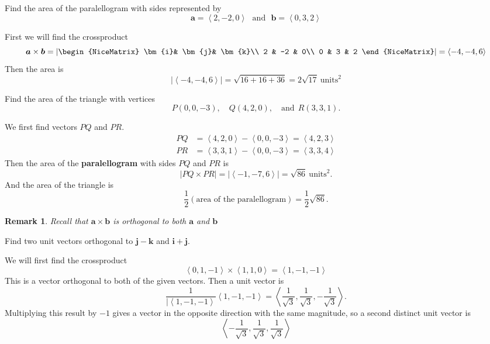 \documentclass[12pt]{exam}
\newcommand{\ba}{\bm{a}}
\newcommand{\bb}{\bm{b}}
\newcommand{\bi}{\bm{i}}
\newcommand{\bj}{\bm{j}}
\newcommand{\bk}{\bm{k}}
\newcommand{\gen}[1]{\left\langle #1 \right\rangle}
\newtheorem*{remark}{Remark}
\begin{document}
\begin{questions}
\question Find the area of the paralellogram with sides represented by
    \[
        \ba=\gen{2,-2,0} ~~~\text{and}~~~ \bb=\gen{0,3,2}
    \]
    \ifprintanswers
        \begin{solution}
            First we will find the crossproduct
            \[
                \ba\times\bb = 
                    \left|\begin{NiceMatrix}
                        \bi & \bj & \bk\\
                        2 & -2 & 0\\
                        0 & 3 & 2
                        \end{NiceMatrix}\right| = \gen{-4,-4,6}
            \]
            Then the area is 
            \[
                |\gen{-4,-4,6}|=\sqrt{16+16+36}=2\sqrt{17}~\text{units}^2
            \]
        \end{solution}
    \else
        \vfill
    \fi    



\question Find the area of the triangle with vertices 
\[
    P(0,0,-3),\quad Q(4,2,0),\quad \text{and}~~R(3,3,1).
\]

\ifprintanswers
        \begin{solution}
            We first find vectors \(PQ\) and \(PR\).
            \begin{align*}
                PQ & = \gen{4,2,0}-\gen{0,0,-3}=\gen{4,2,3}\\
                PR & = \gen{3,3,1}-\gen{0,0,-3}=\gen{3,3,4}
            \end{align*}
        Then the area of the \textbf{paralellogram} with sides \(PQ\) and \(PR\) is
        \[
            |PQ\times PR| = |\gen{-1,-7,6}| = \sqrt{86}~\text{units}^2.
        \]
        And the area of the triangle is 
        \[
            \frac{1}{2}(\text{area of the paralellogram})=\frac{1}{2}\sqrt{86}.
        \]
        
        \end{solution}
    \else
        \vfill
    \fi    

\newpage

\begin{remark}
    Recall that \(\ba\times\bb\) is orthogonal to both \(\ba\) and \(\bb\)
\end{remark}

\question Find two unit vectors orthogonal to \(\bm{j}-\bm{k}\) and \(\bm{i}+\bm{j}\).
\ifprintanswers
        \begin{solution}
            We will first find the crossproduct
            \[
            \gen{0,1,-1}\times\gen{1,1,0} = \gen{1,-1,-1}
            \]
            This is a vector orthogonal to both of the given vectors. Then a unit vector is
            \[
                \frac{1}{|\gen{1,-1,-1}}\gen{1,-1,-1}=\gen{\frac{1}{\sqrt{3}},\frac{1}{\sqrt{3}},-\frac{1}{\sqrt{3}}}.
            \]
            Multiplying this result by \(-1\) gives a vector in the opposite direction with the same magnitude, so a second distinct unit vector is
            \[
                \gen{-\frac{1}{\sqrt{3}},\frac{1}{\sqrt{3}},\frac{1}{\sqrt{3}}}
            \]
        \end{solution}
    \else
        \vfill
    \fi    


\end{questions}
\end{document}
